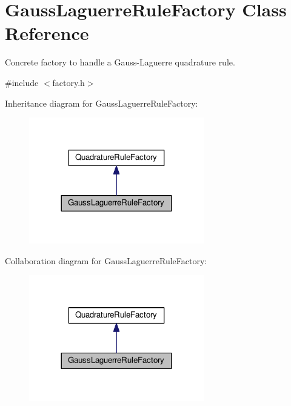 \hypertarget{classGaussLaguerreRuleFactory}{\section{Gauss\-Laguerre\-Rule\-Factory Class Reference}
\label{classGaussLaguerreRuleFactory}
}


Concrete factory to handle a Gauss-\/\-Laguerre quadrature rule.  




{\ttfamily \#include $<$factory.\-h$>$}



Inheritance diagram for Gauss\-Laguerre\-Rule\-Factory\-:\nopagebreak
\begin{figure}[H]
\begin{center}
\leavevmode
\includegraphics[width=216pt]{classGaussLaguerreRuleFactory__inherit__graph}
\end{center}
\end{figure}


Collaboration diagram for Gauss\-Laguerre\-Rule\-Factory\-:\nopagebreak
\begin{figure}[H]
\begin{center}
\leavevmode
\includegraphics[width=216pt]{classGaussLaguerreRuleFactory__coll__graph}
\end{center}
\end{figure}
